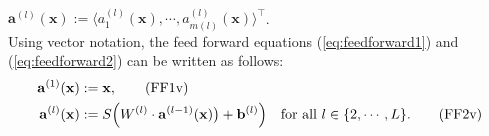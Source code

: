 \\[0.2cm]
\hspace*{1.3cm}
$\mathbf{a}^{(l)}(\mathbf{x}) := \langle a_1^{(l)}(\mathbf{x}), \cdots, a_{m(l)}^{(l)}(\mathbf{x}) \rangle^\top$.
\\[0.2cm]
Using vector notation, the feed forward equations (\ref{eq:feedforward1}) and (\ref{eq:feedforward2}) can be
written as follows:
\begin{align}
  \label{eq:feedforward1v}
  \mathbf{a}^{(1)}(\mathbf{x}) & := \mathbf{x},
  \tag{FF1v} \\ 
  \label{eq:feedforward2v}
  \mathbf{a}^{(l)}(\mathbf{x}) & := 
  S\Bigl( W^{(l)} \cdot \mathbf{a}^{(l-1)}(\mathbf{x})\bigr) + \mathbf{b}^{(l)}\Bigr)
  \quad \mbox{for all $l \in \{2, \cdots, L\}$}.
  \tag{FF2v}
\end{align}

